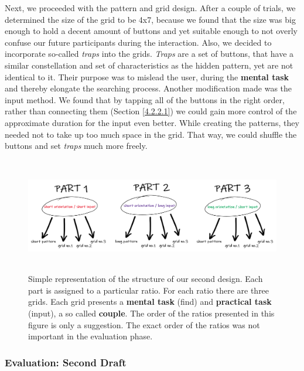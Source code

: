 Next, we proceeded with the pattern and grid design. After a couple of trials, we determined the size of the grid to be 4x7, because we found that the size was big enough to hold a decent amount of buttons and yet suitable enough to not overly confuse our future participants during the interaction. Also, we decided to incorporate so-called \textit{traps} into the grids. \textit{Traps} are a set of buttons, that have a similar constellation and set of characteristics as the hidden pattern, yet are not identical to it. Their purpose was to mislead the user, during the \textbf{mental task} and thereby elongate the searching process. Another modification made was the input method. We found that by tapping all of the buttons in the right order, rather than connecting them (Section \ref{4.2.2.1}) we could gain more control of the approximate duration for the input even better. While creating the patterns, they needed not to take up too much space in the grid. That way, we could shuffle the buttons and set \textit{traps} much more freely. 

\begin{figure}[t!]
\centering
\includegraphics[width=13cm, height=5cm]{Chapters/graphics/prototypeStructure.PNG}
\caption{Simple representation of the structure of our second design. Each part is assigned to a particular ratio. For each ratio there are three grids. Each grid presents a \textbf{mental task} (find) and \textbf{practical task} (input), a so called \textbf{couple}. The order of the ratios presented in this figure is only a suggestion. The exact order of the ratios was not important in the evaluation phase.}
\label{fig:prototype}
\end{figure}

\subsubsection{Evaluation: Second Draft} \label{4.2.2.4}

